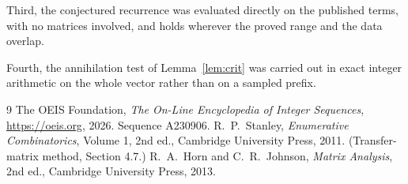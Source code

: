 \documentclass[11pt,a4paper]{article}
\theoremstyle{plain}
\theoremstyle{definition}
\begin{document}
Third, the conjectured recurrence was evaluated directly on the published terms, with no
matrices involved, and holds wherever the proved range and the data overlap.

Fourth, the annihilation test of Lemma~\ref{lem:crit} was carried out in exact integer
arithmetic on the whole vector rather than on a sampled prefix.

\begin{thebibliography}{9}
 The OEIS Foundation, \emph{The On-Line Encyclopedia of Integer
Sequences}, \url{https://oeis.org}, 2026. Sequence A230906.
 R.~P.~Stanley, \emph{Enumerative Combinatorics}, Volume 1, 2nd ed.,
Cambridge University Press, 2011. (Transfer-matrix method, Section 4.7.)
 R.~A.~Horn and C.~R.~Johnson, \emph{Matrix Analysis}, 2nd ed., Cambridge
University Press, 2013.
\end{thebibliography}
\end{document}
